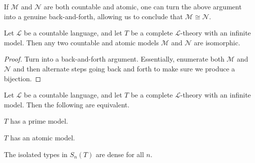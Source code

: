 \documentclass[../notes.tex]{subfiles}
\begin{document}
If $\mathcal M$ and $\mathcal N$ are both countable and atomic, one can turn the above argument into a genuine back-and-forth, allowing us to conclude that $\mathcal M\cong\mathcal N$.
\begin{proposition} \label{prop:countable-atomic-uniq}
	Let $\mathcal L$ be a countable language, and let $T$ be a complete $\mathcal L$-theory with an infinite model. Then any two countable and atomic models $\mathcal M$ and $\mathcal N$ are isomorphic.
\end{proposition}
\begin{proof}
	Turn  into a back-and-forth argument. Essentially, enumerate both $\mathcal M$ and $\mathcal N$ and then alternate steps going back and forth to make sure we produce a bijection.
\end{proof}
\begin{theorem}
	Let $\mathcal L$ be a countable language, and let $T$ be a complete $\mathcal L$-theory with an infinite model. Then the following are equivalent.
	\begin{listalph}
		\item $T$ has a prime model.
		\item $T$ has an atomic model.
		\item The isolated types in $S_n(T)$ are dense for all $n$.
	\end{listalph}
\end{theorem}
\end{document}
